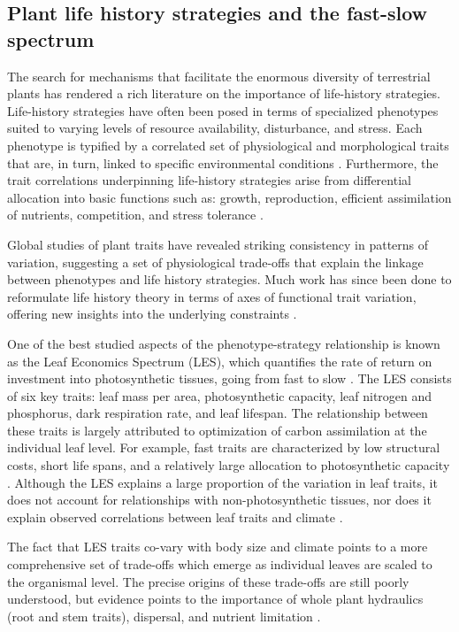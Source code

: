 \subsection{Plant life history strategies and the fast-slow spectrum}

The search for mechanisms that facilitate the enormous diversity of terrestrial plants has rendered a rich literature on the importance of life-history strategies. Life-history strategies have often been posed in terms of specialized phenotypes suited to varying levels of resource availability, disturbance, and stress. Each phenotype is typified by a correlated set of physiological and morphological traits that are, in turn, linked to specific environmental conditions \cite{grime1988a}. Furthermore, the trait correlations underpinning life-history strategies arise from differential allocation into basic functions such as: growth, reproduction, efficient assimilation of nutrients, competition, and stress tolerance \cite{tilman_constraints_1990, mooney_carbon_1972}. 

Global studies of plant traits have revealed striking consistency in patterns of variation, suggesting a set of physiological trade-offs that explain the linkage between phenotypes and life history strategies. Much work has since been done to reformulate life history theory in terms of axes of functional trait variation, offering new insights into the underlying constraints \cite{wright2004a, reich2014a, diaz_global_2016}.

One of the best studied aspects of the phenotype-strategy relationship is known as the Leaf Economics Spectrum (LES), which quantifies the rate of return on investment into photosynthetic tissues, going from fast to slow \cite{wright2004a}. The LES consists of six key traits: leaf mass per area, photosynthetic capacity, leaf nitrogen and phosphorus, dark respiration rate, and leaf lifespan. The relationship between these traits is largely attributed to optimization of carbon assimilation at the individual leaf level. For example, fast traits are characterized by low structural costs, short life spans, and a relatively large allocation to photosynthetic capacity \cite{kikuzawa_cost-benefit_1991, wang2023a}. Although the LES explains a large proportion of the variation in leaf traits, it does not account for relationships with non-photosynthetic tissues, nor does it explain observed correlations between leaf traits and climate \cite{jensen_physical_2013, bin_leaf_2022, Wieczynski2019}. 

The fact that LES traits co-vary with body size and climate points to a more comprehensive set of trade-offs which emerge as individual leaves are scaled to the organismal level. The precise origins of these trade-offs are still poorly understood, but evidence points to the importance of whole plant hydraulics (root and stem traits), dispersal, and nutrient limitation \cite{price_flow_2022, baraloto_decoupled_2010}.

